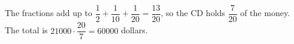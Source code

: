 The fractions add up to $\dfrac12+\dfrac1{10}+\dfrac1{20}=\dfrac{13}{20}$, so the CD holds $\dfrac7{20}$ of the money. The total is $21000\cdot\dfrac{20}7=\boxed{60000}$ dollars.
